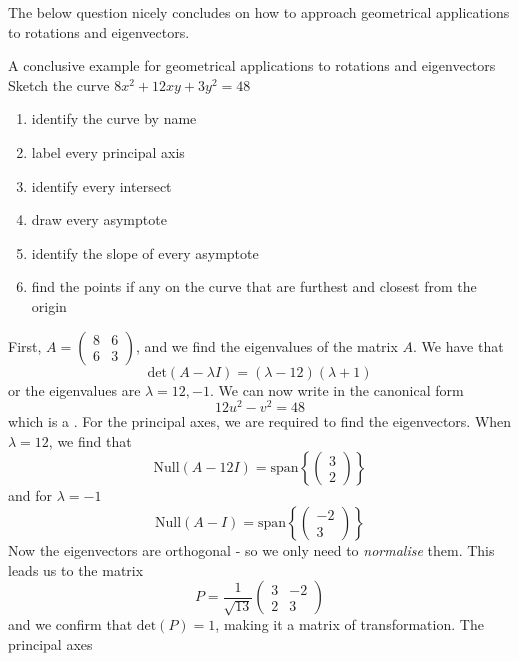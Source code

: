 \documentclass[journal, letterpaper]{IEEEtran}
\begin{document}
    The below question nicely concludes on how to approach geometrical applications to rotations and eigenvectors.
    \begin{mybox}{A conclusive example for geometrical applications to rotations and eigenvectors} \\ 
        Sketch the curve $8x^2 + 12xy + 3y^2 = 48$
        \begin{enumerate}
            \item identify the curve by name
            \item label every principal axis
            \item identify every intersect
            \item draw every asymptote
            \item identify the slope of every asymptote
            \item find the points if any on the curve that are furthest and closest from the origin
        \end{enumerate}
        First, $A = \begin{pmatrix}
            8 & 6 \\ 6 & 3
        \end{pmatrix}$, and we find the eigenvalues of the matrix $A$. We have that
        $$ \text{det}(A - \lambda I) = (\lambda - 12)(\lambda + 1)$$
        or the eigenvalues are $\lambda = 12, -1$. We can now write in the canonical form
        $$ 12u^2 - v^2 = 48$$
        which is a . For the principal axes, we are required to find the eigenvectors. When 
        $\lambda = 12$, we find that
        $$ \text{Null}(A - 12 I) = \text{span}\left\{\begin{pmatrix}
        3 \\ 2
        \end{pmatrix} \right\}$$
        and for $\lambda = -1$
        $$ \text{Null}(A - I) = \text{span}\left\{\begin{pmatrix}
            -2 \\ 3
        \end{pmatrix} \right\}$$
        Now the eigenvectors are orthogonal - so we only need to \textit{normalise} them. This leads us to the matrix
        $$ P = \frac{1}{\sqrt{13}}\begin{pmatrix}
            3 & -2 \\ 2 & 3
        \end{pmatrix}$$
        and we confirm that $\text{det}(P) = 1$, making it a matrix of transformation. The principal axes 

\end{mybox}
\end{document}
